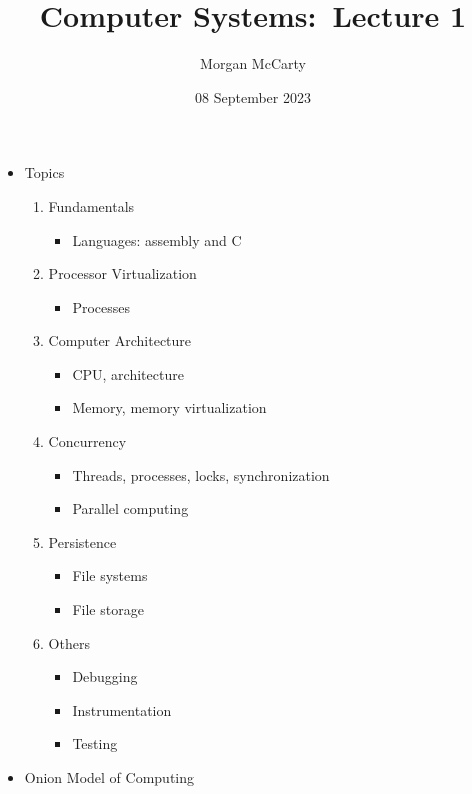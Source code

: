 \documentclass[12pt]{article}
\title{
    Computer Systems:\ Lecture 1}
\author{Morgan McCarty}
\date{08 September 2023}
\begin{document}
    \maketitle

    \begin{itemize}
        \item Topics
        \begin{enumerate}
            \item Fundamentals
            \begin{itemize}
                \item Languages: assembly and C
            \end{itemize}
            \item Processor Virtualization
            \begin{itemize}
                \item Processes
            \end{itemize}
            \item Computer Architecture
            \begin{itemize}
                \item CPU, architecture
                \item Memory, memory virtualization
            \end{itemize}
            \item Concurrency
            \begin{itemize}
                \item Threads, processes, locks, synchronization
                \item Parallel computing
            \end{itemize}
            \item Persistence
            \begin{itemize}
                \item File systems
                \item File storage
            \end{itemize}
            \item Others
            \begin{itemize}
                \item Debugging
                \item Instrumentation
                \item Testing
            \end{itemize}
        \end{enumerate}
        \item Onion Model of Computing

\end{itemize}
\end{document}
